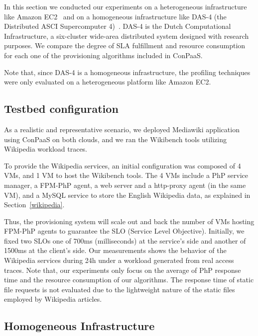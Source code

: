 In this section we conducted our experiments on a heterogeneous infrastructure like Amazon EC2~\cite{amazonEC2} and on a homogeneous infrastructure like DAS-4 (the Distributed ASCI Supercomputer 4)~\cite{das4}. DAS-4 is the Dutch Computational Infrastructure, a six-cluster wide-area distributed system designed with research purposes.  We compare the degree of SLA fulfillment and resource consumption for each one of the provisioning algorithms included in ConPaaS.

Note that, since DAS-4 is a homogeneous infrastructure, the profiling techniques were only evaluated on a heterogeneous platform like Amazon EC2. 



\subsection{Testbed configuration}

As a realistic and representative scenario, we deployed Mediawiki application using ConPaaS on both clouds, and we ran the Wikibench tools utilizing Wikipedia workload traces.  

To provide the Wikipedia services, an initial configuration was composed of 4 VMs, and 1 VM to host the Wikibench tools. The 4 VMs include a PhP service manager, a FPM-PhP agent, a web server and a http-proxy agent (in the same VM), and a MySQL service to store the English Wikipedia data, as explained in Section~\ref{wikipedia}.

Thus, the provisioning system will scale out and back the number of VMs hosting FPM-PhP agents to guarantee the SLO (Service Level Objective). Initially, we fixed two SLOs one of 700ms (milliseconds) at the service's side and another of 1500ms at the client's side. Our measurements shows the behavior of the Wikipedia services during 24h under a workload generated from real access traces. Note that, our experiments only focus on the average of PhP response time and the resource consumption of our algorithms. The response time of static file requests is not evaluated due to the lightweight nature of the static files employed by Wikipedia articles. 

\subsection{Homogeneous Infrastructure}

